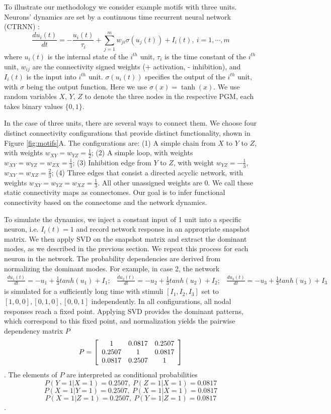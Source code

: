 \documentclass[letterpaper,11pt]{article}
\newcommand\tab[1][6mm]{\hspace*{#1}}
\newenvironment{mat}{\left[\begin{array}{ccccccccccccccc}}{\end{array}\right]}
\newcommand\bcm{\begin{mat}}
\newcommand\ecm{\end{mat}}
\begin{document}
\tab To illustrate our methodology we consider example motifs with three units.
Neurons' dynamics are set by a continuous time recurrent neural network (CTRNN) \cite{ctrnn}:
\[ \frac{du_i(t)}{dt}=-\frac{u_i(t)}{\tau_i}+\sum_{j=1}^m w_{ji}\sigma(u_j(t))+I_i(t), \ i=1, \cdots, m\]
where $u_i(t)$ is the internal state of the $i^{th}$ unit, $\tau_i$ is the time constant of the $i^{th}$ unit, $w_{ij}$ are the connectivity signed weights (+ activation, - inhibition), and $I_i(t)$ is the input into $i^{th}$ unit. $\sigma(u_i(t))$ specifies the output of the $i^{th}$ unit, with $\sigma$ being the output function. Here we use $\sigma(x)=\tanh(x)$. We use random variables $X$, $Y$, $Z$ to denote the three nodes in the respective PGM, each takes binary values $\{0,1\}$.

In the case of three units, there are several ways to connect them. We choose four distinct connectivity configurations that provide distinct functionality, shown in Figure \ref{fig:motifs}A. The configurations are: (1) A simple chain from $X$ to $Y$ to $Z$, with weights $w_{XY}=w_{YZ}=\frac{1}{2}$; (2) A simple loop, with weights $w_{XY}=w_{YZ}=w_{ZX}=\frac{1}{3}$; (3) Inhibition edge from $Y$ to $Z$, with weight $w_{YZ}=-\frac{1}{3}$, $w_{XY}=w_{XZ}=\frac{2}{3}$; (4) Three edges that consist a directed acyclic network, with weights $w_{XY}=w_{YZ}=w_{XZ}=\frac{1}{3}$. All other unassigned weights are 0. We call these static connectivity maps as connectomes. Our goal is to infer functional connectivity based on the connectome and the network dynamics.

To simulate the dynamics, we inject a constant input of 1 unit into a specific neuron, i.e. $I_i(t)=1$ and record network response in an appropriate snapshot matrix. We then apply SVD on the snapshot matrix and extract the dominant modes, as we described in the previous section. We repeat this process for each neuron in the network. The probability dependencies are derived from normalizing the dominant modes. For example, in case 2, the network
\begin{align*}
\frac{du_1(t)}{dt}=-u_1+\frac{1}{3}tanh(u_1)+I_1;&
\frac{du_2(t)}{dt}=-u_2+\frac{1}{3}tanh(u_2)+I_2;&
\frac{du_3(t)}{dt}=-u_3+\frac{1}{3}tanh(u_3)+I_3&
\end{align*}
is simulated for a sufficiently long time with stimuli $[I_1, I_2, I_3]$ set to  $[1,0,0], [0,1,0], [0,0,1]$ independently. In all configurations, all nodal responses reach a fixed point. Applying SVD provides the dominant patterns, which correspond to this fixed point, and normalization yields the pairwise dependency matrix $P$
\[P=\bcm 1 & 0.0817 & 0.2507\\ 0.2507 & 1 & 0.0817\\ 0.0817 & 0.2507 &1\ecm\]. The elements of $P$ are interpreted as conditional probabilities
\[P(Y=1|X=1)=0.2507,\ P(Z=1|X=1)=0.0817\]
\[P(X=1|Y=1)=0.2507,\ P(X=1|X=1)=0.0817\]
\[P(X=1|Z=1)=0.2507,\ P(Y=1|Z=1)=0.0817\].
\end{document}
